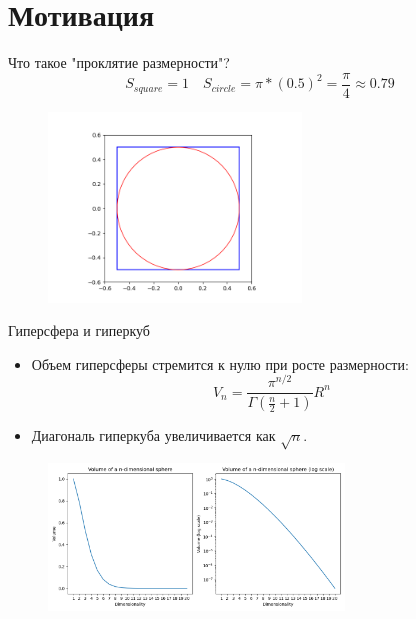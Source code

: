 \section{Мотивация}

\begin{frame}{Что такое "проклятие размерности"?}
    $$
        S_{square}=1 \quad S_{circle}=\pi*(0.5)^2=\frac{\pi}{4}\approx0.79
    $$
    \begin{figure}
        \includegraphics[width=0.6\textwidth]{../resources/motivation/inscribed_circle.png}
    \end{figure}
\end{frame}

\begin{frame}{Гиперсфера и гиперкуб}
    \begin{itemize}
        \item Объем гиперсферы стремится к нулю при росте размерности:
              \begin{equation*}
                  V_n = \frac{\pi^{n/2}}{\Gamma(\frac{n}{2}+1)}R^n
              \end{equation*}
        \item Диагональ гиперкуба увеличивается как \(\sqrt{n}\).
    \end{itemize}
    \begin{figure}
        \centering
        \includegraphics[width=0.7\textwidth]{../resources/motivation/sphere_volume.png}
    \end{figure}
\end{frame}

